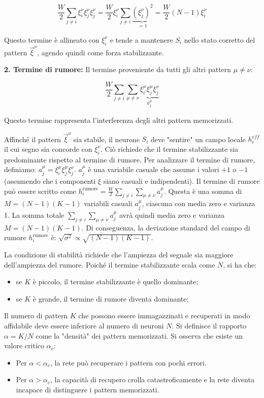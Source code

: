 \begin{equation} \label{eq:ch21_27}
\frac{W}{2} \sum_{j \neq i} \xi_i^\nu \xi_j^\nu \xi_j^\nu = \frac{W}{2} \xi_i^\nu \sum_{j \neq i} \underbrace{(\xi_j^\nu)^2}_{=1} = \frac{W}{2} (N-1) \xi_i^\nu
\end{equation}

Questo termine è allineato con $\xi_i^\nu$ e tende a mantenere $S_i$ nello stato corretto del pattern $\vec{\xi}^\nu$, agendo quindi come forza stabilizzante.

\textbf{2. Termine di rumore:}
Il termine proveniente da tutti gli altri pattern $\mu \neq \nu$:

\begin{equation} \label{eq:ch21_28}
\frac{W}{2} \sum_{j \neq i} \sum_{\mu \neq \nu} \underbrace{\xi_i^\mu \xi_j^\mu \xi_j^\nu}_{a^{\mu}_j}
\end{equation}

Questo termine rappresenta l'interferenza degli altri pattern memorizzati.

Affinché il pattern $\vec{\xi}^\nu$ sia stabile, il neurone $S_i$ deve "sentire" un campo locale $h_i^{eff}$ il cui segno sia concorde con $\xi_i^\nu$. Ciò richiede che il termine stabilizzante sia predominante rispetto al termine di rumore.
Per analizzare il termine di rumore, definiamo: $a_j^\mu = \xi_i^\mu \xi_j^\mu \xi_j^\nu$.
$a_j^\mu$ è una variabile casuale che assume i valori $+1$ o $-1$ (assumendo che i componenti $\xi$ siano casuali e indipendenti).
Il termine di rumore può essere scritto come $h_i^{\text{rumore}} = \frac{W}{2} \sum_{j \neq i} \sum_{\mu \neq \nu} a_j^\mu$.
Questa è una somma di $M = (N-1)(K-1)$ variabili casuali $a_j^\mu$, ciascuna con media zero e varianza 1.
La somma totale $\sum_{j \neq i} \sum_{\mu \neq \nu} a_j^\mu$ avrà quindi media zero e varianza $M = (N-1)(K-1)$.
Di conseguenza, la deviazione standard del campo di rumore $h_i^{\text{rumore}}$ è:
$ \sqrt{\sigma^2} \propto \sqrt{(N-1)(K-1)} $.

La condizione di stabilità richiede che l'ampiezza del segnale sia maggiore dell'ampiezza del rumore. Poiché il termine stabilizzante scala come $N$, si ha che:
\begin{itemize}
    \item se $K$ è piccolo, il termine stabilizzante è quello dominante;
    \item se $K$ è grande, il termine di rumore diventa dominante;
\end{itemize}

Il numero di pattern $K$ che possono essere immagazzinati e recuperati in modo affidabile deve essere inferiore al numero di neuroni $N$.
Si definisce il rapporto $\alpha = K/N$ come la "densità" dei pattern memorizzati. Si osserva che esiste un valore critico $\alpha_c$:
\begin{itemize}
    \item Per $\alpha < \alpha_c$, la rete può recuperare i pattern con pochi errori.
    \item Per $\alpha > \alpha_c$, la capacità di recupero crolla catastroficamente e la rete diventa incapace di distinguere i pattern memorizzati.
\end{itemize}

